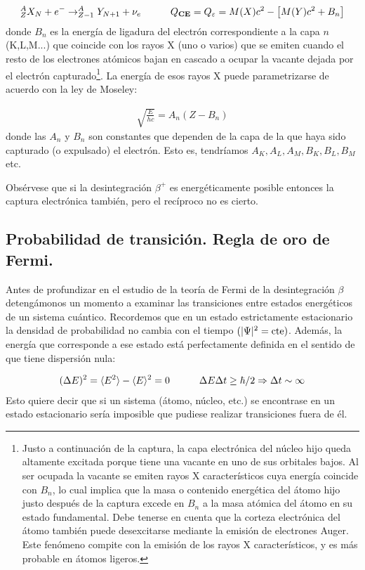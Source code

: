 \begin{equation}
	^A_ZX_N + e^- \rightarrow ^A_{Z-1} Y_{N+1} + \nu_e \quad \quad \quad Q_{\textbf{CE}} = Q_\varepsilon = M(X) c^2 - \left[ M(Y)c^2+ B_n \right]
\end{equation}
donde $B_n$ es la energía de ligadura del electrón correspondiente a la capa $n$ (K,L,M...) que coincide con los rayos X (uno o varios) que se emiten cuando el resto de los electrones atómicos bajan en cascado a ocupar la vacante dejada por el electrón capturado\footnote{Justo a continuación de la captura, la capa electrónica del núcleo hijo queda altamente excitada porque tiene una vacante en uno de sus orbitales bajos. Al ser ocupada la vacante se emiten rayos X característicos cuya energía coincide con $B_n$, lo cual implica que la masa o contenido energética del átomo hijo justo después de la captura excede en $B_n$ a la masa atómica del átomo en su estado fundamental. Debe tenerse en cuenta que la corteza electrónica del átomo también puede desexcitarse mediante la emisión de electrones Auger. Este fenómeno compite con la emisión de los rayos X característicos, y es más probable en átomos ligeros.}. La energía de esos rayos X puede parametrizarse de acuerdo con la ley de Moseley:

\begin{eqnarray}
	\sqrt{\frac{E}{hc}} = A_n (Z-B_n)
\end{eqnarray}	
donde las $A_n$ y $B_n$ son constantes que dependen de la capa de la que haya sido capturado (o expulsado) el electrón. Esto es, tendríamos $A_K,A_L,A_M,B_K,B_L,B_M$ etc.

Obsérvese que si la desintegración $\beta^+$ es energéticamente posible entonces la captura electrónica también, pero el recíproco no es cierto. 

\subsection{Probabilidad de transición. Regla de oro de Fermi.}

Antes de profundizar en el estudio de la teoría de Fermi de la desintegración $\beta$ detengámonos un momento a examinar las transiciones entre estados energéticos de un sistema cuántico. Recordemos que en un estado estrictamente estacionario la densidad de probabilidad no cambia con el tiempo $(|\Psi|^2 = \text{cte})$. Además, la energía que corresponde a ese estado está perfectamente definida en el sentido de que tiene dispersión nula:

\begin{eqnarray}
	(\Delta E)^2 = \langle E^2 \rangle - \langle E \rangle^2 = 0 \quad \quad \quad \Delta E \Delta t \geq \hbar / 2 \Rightarrow \Delta t \sim \infty
\end{eqnarray}
Esto quiere decir que si un sistema (átomo, núcleo, etc.) se encontrase en un estado estacionario sería imposible que pudiese realizar transiciones fuera de él. %


